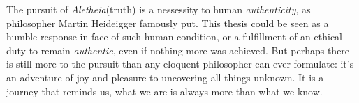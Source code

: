 The pursuit of \textit{Aletheia}(truth) is a nessessity to human \textit{authenticity}, as philosopher Martin Heideigger famously put. This thesis could be seen as a humble response in face of such human condition, or a fulfillment of an ethical duty to remain \textit{authentic}, even if nothing more was achieved. But perhaps there is still more to the pursuit than any eloquent philosopher can ever formulate: it's an adventure of
joy and pleasure to uncovering all things unknown. It is a journey that reminds us, what we are is always more than what we know.












